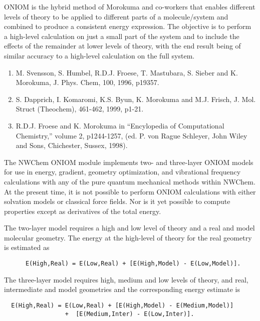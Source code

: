 \label{sec:oniom}

ONIOM is the hybrid method of Morokuma and co-workers that enables
different levels of theory to be applied to different parts of a
molecule/system and combined to produce a consistent energy
expression.  The objective is to perform a high-level calculation on
just a small part of the system and to include the effects of the
remainder at lower levels of theory, with the end result being of
similar accuracy to a high-level calculation on the full system.

\begin{enumerate}
\item M. Svensson, S. Humbel, R.D.J. Froese, T. Mastubara, S. Sieber and
K. Morokuma, J. Phys. Chem, 100, 1996, p19357.
\item  S. Dapprich, I. Komaromi, K.S. Byun, K. Morokuma and M.J. Frisch,
J. Mol. Struct (Theochem), 461-462, 1999, p1-21.
\item R.D.J. Froese and K. Morokuma in ``Encylopedia of Computational Chemistry,'' volume 2, p1244-1257, (ed. P. von Rague Schleyer, John Wiley and Sons, Chichester, Sussex, 1998).
\end{enumerate}

The NWChem ONIOM module implements two- and three-layer ONIOM models
for use in energy, gradient, geometry optimization, and vibrational
frequency calculations with any of the pure quantum mechanical methods
within NWChem.  At the present time, it is not possible to perform
ONIOM calculations with either solvation models or classical force
fields.  Nor is it yet possible to compute properties except as
derivatives of the total energy.  

The two-layer model requires a high and low level of theory and a
real and model molecular geometry.  The energy at the high-level of
theory for the real geometry is estimated as
\begin{verbatim}
      E(High,Real) = E(Low,Real) + [E(High,Model) - E(Low,Model)].
\end{verbatim}
The three-layer model requires high, medium and low levels of theory,
and real, intermediate and model geometries and the corresponding
energy estimate is
\begin{verbatim}
  E(High,Real) = E(Low,Real) + [E(High,Model) - E(Medium,Model)]
                 +  [E(Medium,Inter) - E(Low,Inter)].
\end{verbatim}


